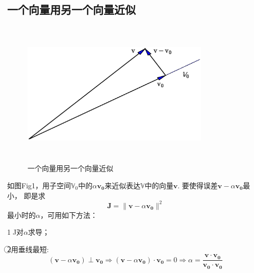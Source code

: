 \documentclass{article}
\begin{document}
\begin{CJK}{UTF8}{gbsn}
\section{一个向量用另一个向量近似}
\begin{figure}[H]
\centering  
\includegraphics[height=7cm,width=9cm]{./figs/fig1.eps}  
\caption{一个向量用另一个向量近似}
\label{1}  
\end{figure}
	如图Fig1，用子空间$\mathbb{V}_0$中的$\alpha\boldsymbol{v_0}$来近似表达$\mathbb{V}$中的向量$\boldsymbol{v}$.
	要使得误差$\boldsymbol{v}-\alpha\boldsymbol{v_0}$最小，
	即是求$$\boldsymbol{J}=\parallel\boldsymbol{v}-\alpha\boldsymbol{v_0}\parallel ^2$$最小时的$\alpha$，可用如下方法：\par
	\indent\textcircled{1}J对$\alpha$求导；\par
	\indent\textcircled{2}用垂线最短:
	$$(\boldsymbol{v}-\alpha\boldsymbol{v_0})\perp\boldsymbol{v_0} 
	\Rightarrow
	(\boldsymbol{v}-\alpha\boldsymbol{v_0})\cdot\boldsymbol{v_0}=0
	\Rightarrow
	\alpha =\frac{\boldsymbol{v}\cdot\boldsymbol{v_0}}{\boldsymbol{v_0}\cdot\boldsymbol{v_0}}$$\\



\end{CJK}
\end{document}
